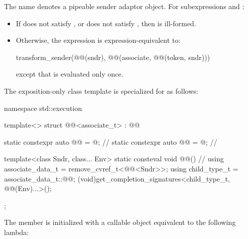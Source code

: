 \pnum
The name  denotes a pipeable sender adaptor object.
For subexpressions  and :
\begin{itemize}
\item
If  does not satisfy , or
does not satisfy , then
 is ill-formed.
\item
Otherwise,
the expression 
is expression-equivalent to:
\begin{codeblock}
transform_sender(@@(sndr),
                 @@(associate, @@(token, sndr)))
\end{codeblock}
except that  is evaluated only once.
\end{itemize}

\pnum
The exposition-only class template 
is specialized for  as follows:
%
\begin{codeblock}
namespace std::execution {
  template<>
  struct @@<associate_t> : @@ {
    static constexpr auto @@ = @\seebelow@;                // \expos
    static constexpr auto @@ = @\seebelow@;                    // \expos

    template<class Sndr, class... Env>
      static consteval void @@() {                     // \expos
        using associate_data_t = remove_cvref_t<@@<Sndr>>;
        using child_type_t = associate_data_t::@@;
        (void)get_completion_signatures<child_type_t, @@(Env)...>();
    }
  };
}
\end{codeblock}

\pnum
The member 
is initialized with a callable object equivalent to the following lambda:


